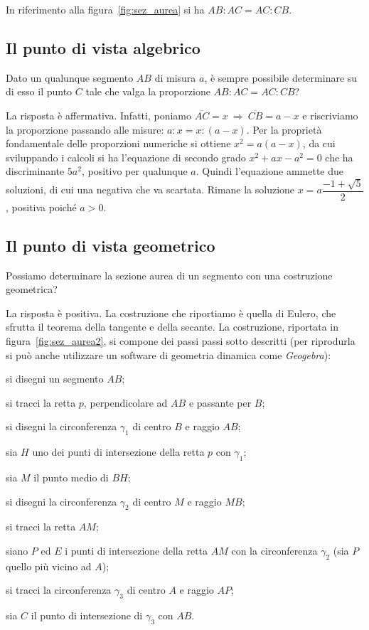 In riferimento alla figura~\ref{fig:sez_aurea} si ha \(AB : AC = AC : 
CB\).

\subsection{Il punto di vista algebrico}

Dato un qualunque segmento \(AB\) di misura \(a\), è sempre possibile 
determinare su di esso il punto \(C\) tale che valga la proporzione \(AB 
: AC = AC : CB\)?

La risposta è affermativa. Infatti, poniamo 
\(\overline{AC}=x\:\Rightarrow\:\overline{CB}=a-x\) e riscriviamo la 
proporzione passando alle misure: \(a : x = x : (a-x)\).
Per la proprietà fondamentale delle proporzioni numeriche si ottiene 
\(x^2=a(a-x)\), da cui  sviluppando i calcoli si ha l'equazione di 
secondo grado \(x^2+ax-a^2=0\) che ha discriminante \(5a^2\), positivo 
per qualunque \(a\). Quindi l'equazione ammette due soluzioni, di cui 
una negativa che va scartata. Rimane la soluzione 
\(x=a\dfrac{-1+\sqrt{5}}{2}\), positiva poiché \(a>0\).

\subsection{Il punto di vista geometrico}

Possiamo determinare la sezione aurea di un segmento con una 
costruzione geometrica?

La risposta è positiva. La costruzione che riportiamo è quella di 
Eulero, che sfrutta il teorema della tangente e della secante.
La costruzione, riportata in figura~\ref{fig:sez_aurea2}, si compone 
dei passi passi sotto descritti (per riprodurla si può anche 
utilizzare un software di geometria dinamica come \emph{Geogebra}):

\begin{enumerate*}
\item si disegni un segmento \(AB\);
\item si tracci la retta \(p\), perpendicolare ad \(AB\) e passante per 
\(B\);
\item si disegni la circonferenza \(\gamma_1\) di centro \(B\) e raggio 
\(AB\);
\item sia \(H\) uno dei punti di intersezione della retta \(p\) con 
\(\gamma_1\);
\item sia \(M\) il punto medio di \(BH\);
\item si disegni la circonferenza \(\gamma_2\) di centro \(M\) e raggio 
\(MB\);
\item si tracci la retta \(AM\);
\item siano \(P\) ed \(E\) i punti di intersezione della retta \(AM\) con 
la circonferenza \(\gamma_2\) (sia \(P\) quello più vicino ad \(A\));
\item si tracci la circonferenza \(\gamma_3\) di centro \(A\) e raggio 
\(AP\);
\item sia \(C\) il punto di intersezione di \(\gamma_3\) con \(AB\).
\end{enumerate*}


